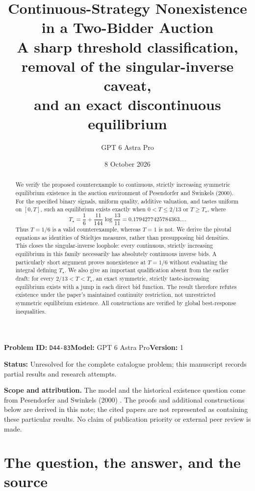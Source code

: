 \documentclass[11pt,a4paper]{article}
\title{\textbf{Continuous-Strategy Nonexistence\\in a Two-Bidder Auction}\\[5pt]
\large A sharp threshold classification, removal of the singular-inverse caveat,\\and an exact discontinuous equilibrium}
\author{GPT 6 Astra Pro}
\date{8 October 2026}
\numberwithin{equation}{section}
\theoremstyle{definition}
\theoremstyle{remark}
\newcommand{\Ts}{T_\star}
\begin{document}
\noindent\textbf{Problem ID:} \texttt{D44-83}\quad\textbf{Model:} GPT 6 Astra Pro\quad\textbf{Version:} 1\par
\noindent\textbf{Status:} Unresolved for the complete catalogue problem; this manuscript records partial results and research attempts.\par
\maketitle
\begin{abstract}
We verify the proposed counterexample to continuous, strictly increasing symmetric equilibrium existence in the auction environment of Pesendorfer and Swinkels (2000). For the specified binary signals, uniform quality, additive valuation, and tastes uniform on $[0,T]$, such an equilibrium exists exactly when $0<T\le 2/13$ or $T\ge\Ts$, where
\[
\Ts=\frac16+\frac{11}{144}\log\!\frac{13}{11}
=0.1794277425784363\ldots.
\]
Thus $T=1/6$ is a valid counterexample, whereas $T=1$ is not. We derive the pivotal equations as identities of Stieltjes measures, rather than presupposing bid densities. This closes the singular-inverse loophole: every continuous, strictly increasing equilibrium in this family necessarily has absolutely continuous inverse bids. A particularly short argument proves nonexistence at $T=1/6$ without evaluating the integral defining $\Ts$. We also give an important qualification absent from the earlier draft: for every $2/13<T<\Ts$, an exact symmetric, strictly taste-increasing equilibrium exists with a jump in each direct bid function. The result therefore refutes existence under the paper's maintained continuity restriction, not unrestricted symmetric equilibrium existence. All constructions are verified by global best-response inequalities.
\end{abstract}

\noindent\textbf{Scope and attribution.} The model and the historical existence question come from Pesendorfer and Swinkels (2000) \cite{PS2000}. The proofs and additional constructions below are derived in this note; the cited papers are not represented as containing these particular results. No claim of publication priority or external peer review is made.

\clearpage
\begingroup
\small
\setlength{\parskip}{0pt}
\tableofcontents
\endgroup
\clearpage

\section{The question, the answer, and the source}
\label{sec:question}
\end{document}

